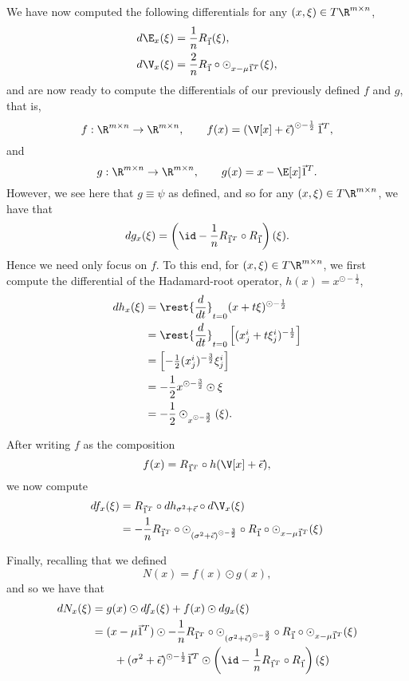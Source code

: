 We have now computed the following differentials for any $(x,\xi)\in T\R^{m\times n}$,
\begin{align*}
	d\E_x(\xi)&=\frac{1}{n}R_{\vec{1}}(\xi),\\
	d\V_x(\xi)&=\frac{2}{n}R_{\vec{1}}\circ\odot_{x-\mu\vec{1}^T}(\xi),
\end{align*}
and are now ready to compute the differentials of our previously defined $f$ and $g$, that is,
$$f:\R^{m\times n}\to\R^{m\times n},\qquad f(x)=\left(\V[x]+\vec{\epsilon}\right)^{\odot-\frac{1}{2}}\vec{1}^T,$$
and
$$g:\R^{m\times n}\to\R^{m\times n},\qquad g(x)=x-\E[x]\vec{1}^T.$$
However, we see here that $g\equiv\psi$ as defined, and so for any $(x,\xi)\in T\R^{m\times n}$, we have that
$$dg_x(\xi)=\left(\id-\frac{1}{n}R_{\vec{1}^T}\circ R_{\vec{1}}\right)(\xi).$$
Hence we need only focus on $f$.  To this end, for $(x,\xi)\in T\R^{m\times n}$, we first compute the differential of the Hadamard-root operator, $h(x)=x^{\odot-\frac{1}{2}}$,
\begin{align*}
	dh_x(\xi)&=\rest{\frac{d}{dt}}_{t=0}(x+t\xi)^{\odot-\frac{1}{2}}\\
	&=\rest{\frac{d}{dt}}_{t=0}\begin{bmatrix}
		(x^i_j+t\xi^i_j)^{-\frac{1}{2}}
	\end{bmatrix}\\
	&=\begin{bmatrix}
		-\frac{1}{2}(x^i_j)^{-\frac{3}{2}}\xi^i_j
	\end{bmatrix}\\
	&=-\frac{1}{2}x^{\odot-\frac{3}{2}}\odot\xi\\
	&=-\frac{1}{2}\odot_{x^{\odot-\frac{3}{2}}}(\xi).
\end{align*}

After writing $f$ as the composition
$$f(x)=R_{\vec{1}^T}\circ h(\V[x]+\vec{\epsilon}),$$
we now compute
\begin{align*}
	df_x(\xi)&=R_{\vec{1}^T}\circ dh_{\sigma^2+\vec{\epsilon}}\circ d\V_x(\xi)\\
	&=-\frac{1}{n}R_{\vec{1}^T}\circ\odot_{(\sigma^2+\vec{\epsilon})^{\odot-\frac{3}{2}}}\circ R_{\vec{1}}\circ\odot_{x-\mu\vec{1}^T}(\xi)
\end{align*}

Finally, recalling that we defined
$$N(x)=f(x)\odot g(x),$$
and so we have that
\begin{align*}
	dN_x(\xi)&=g(x)\odot df_x(\xi)+f(x)\odot dg_x(\xi)\\
	&=(x-\mu\vec{1}^T)\odot -\frac{1}{n}R_{\vec{1}^T}\circ\odot_{(\sigma^2+\vec{\epsilon})^{\odot-\frac{3}{2}}}\circ R_{\vec{1}}\circ\odot_{x-\mu\vec{1}^T}(\xi)\\
	&\qquad +(\sigma^2+\vec{\epsilon})^{\odot-\frac{1}{2}}\vec{1}^T\odot \left(\id-\frac{1}{n}R_{\vec{1}^T}\circ R_{\vec{1}}\right)(\xi)
\end{align*}






\begin{comment}
	

\subsection{Python Implementation}

\TOX{Work in Progress}


\end{comment}


